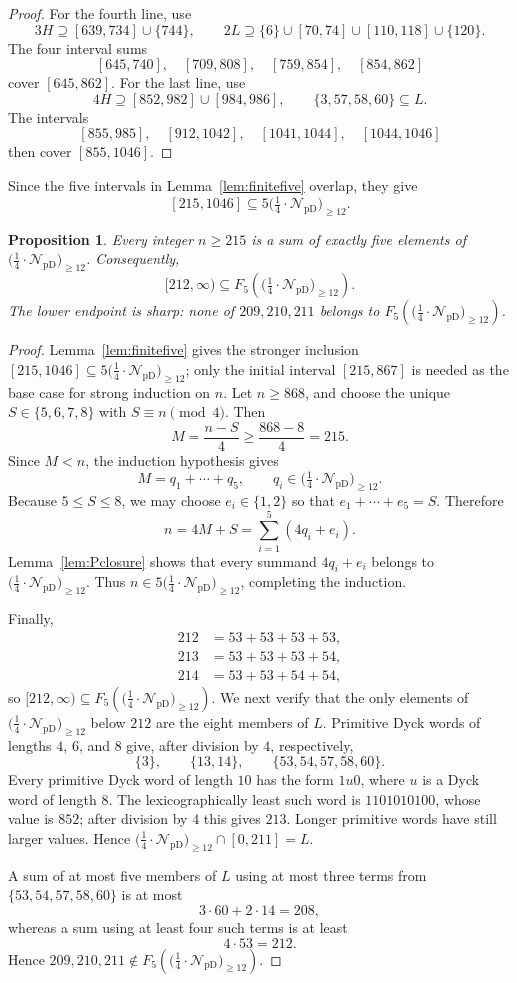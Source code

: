 \documentclass[12pt]{article}
\theoremstyle{plain}
\newtheorem{proposition}[theorem]{Proposition}
\newcommand{\Pset}{\bigl(\tfrac14\cdot
  \mathcal N_{\mathrm{pD}}\bigr)_{\ge 12}}
\begin{document}
\begin{proof}
For the fourth line, use
\[
 3H\supseteq[639,734]\cup\{744\},\qquad
 2L\supseteq\{6\}\cup[70,74]\cup[110,118]\cup\{120\}.
\]
The four interval sums
\[
 [645,740],\quad[709,808],\quad[759,854],\quad[854,862]
\]
cover $[645,862]$.  For the last line, use
\[
 4H\supseteq[852,982]\cup[984,986],
 \qquad \{3,57,58,60\}\subseteq L.
\]
The intervals
\[
 [855,985],\quad[912,1042],\quad[1041,1044],\quad[1044,1046]
\]
then cover $[855,1046]$.
\end{proof}

Since the five intervals in Lemma~\ref{lem:finitefive} overlap, they give
\[
 [215,1046]\subseteq5\Pset.
\]

\begin{proposition}\label{prop:fiveP}
Every integer $n\geq215$ is a sum of exactly five elements of $\Pset$.
Consequently,
\[
 [212,\infty)\subseteq F_5(\Pset).
\]
The lower endpoint is sharp: none of $209,210,211$ belongs to
$F_5(\Pset)$.
\end{proposition}

\begin{proof}
Lemma~\ref{lem:finitefive} gives the stronger inclusion
$[215,1046]\subseteq5\Pset$; only the initial interval $[215,867]$ is
needed as the base case for strong induction on $n$.  Let $n\geq868$, and
choose the unique
$S\in\{5,6,7,8\}$ with $S\equiv n\pmod 4$.  Then
\[
 M=\frac{n-S}{4}\geq\frac{868-8}{4}=215.
\]
Since $M<n$, the induction hypothesis gives
\[
 M=q_1+\cdots+q_5,\qquad q_i\in\Pset.
\]
Because $5\leq S\leq8$, we may choose $e_i\in\{1,2\}$ so that
$e_1+\cdots+e_5=S$.  Therefore
\[
 n=4M+S=\sum_{i=1}^{5}(4q_i+e_i).
\]
Lemma~\ref{lem:Pclosure} shows that every summand $4q_i+e_i$ belongs to
$\Pset$.  Thus $n\in5\Pset$, completing the induction.

Finally,
\[
\begin{aligned}
212&=53+53+53+53,\\
213&=53+53+53+54,\\
214&=53+53+54+54,
\end{aligned}
\]
so $[212,\infty)\subseteq F_5(\Pset)$.  We next verify that the only elements of $\Pset$ below $212$ are the
eight members of $L$.  Primitive Dyck words of lengths $4$, $6$, and $8$
give, after division by $4$, respectively,
\[
 \{3\},\qquad \{13,14\},\qquad \{53,54,57,58,60\}.
\]
Every primitive Dyck word of length $10$ has the form $1u0$, where $u$
is a Dyck word of length $8$.  The lexicographically least such word is
$1101010100$, whose value is $852$; after division by $4$ this gives
$213$.  Longer primitive words have still larger values.  Hence
$\Pset\cap[0,211]=L$.

A sum of at most five members of $L$ using at most three terms from
$\{53,54,57,58,60\}$ is at most
\[
 3\cdot60+2\cdot14=208,
\]
whereas a sum using at least four such terms is at least
\[
 4\cdot53=212.
\]
Hence $209,210,211\notin F_5(\Pset)$.
\end{proof}
\end{document}
